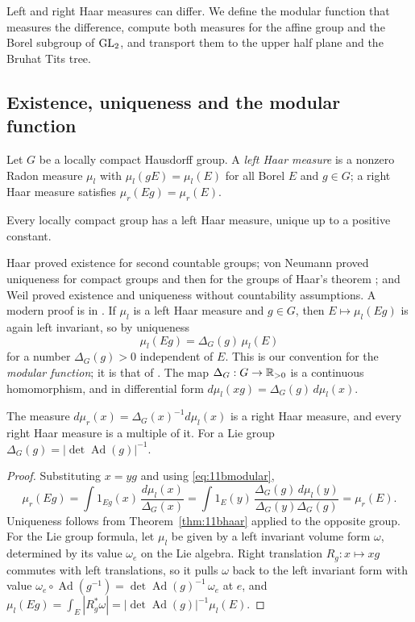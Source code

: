 Left and right Haar measures can differ. We define the modular function that measures the difference, compute both measures for the affine group and the Borel subgroup of $\mathrm{GL}_2$, and transport them to the upper half plane and the Bruhat Tits tree.

\subsection{Existence, uniqueness and the modular function}

Let $G$ be a locally compact Hausdorff group. A \emph{left Haar measure} is a nonzero Radon measure $\mu_l$ with $\mu_l(gE)=\mu_l(E)$ for all Borel $E$ and $g\in G$; a right Haar measure satisfies $\mu_r(Eg)=\mu_r(E)$.

\begin{theorem}\label{thm:11bhaar}
Every locally compact group has a left Haar measure, unique up to a positive constant.
\end{theorem}

Haar \cite{haar1933} proved existence for second countable groups; von Neumann proved uniqueness for compact groups \cite{vonneumann1934} and then for the groups of Haar's theorem \cite{vonneumann1936}; and Weil \cite{weil1940} proved existence and uniqueness without countability assumptions. A modern proof is in \cite{folland1995}. If $\mu_l$ is a left Haar measure and $g\in G$, then $E\mapsto\mu_l(Eg)$ is again left invariant, so by uniqueness
\begin{equation}\label{eq:11bmodular}
\mu_l(Eg)=\Delta_G(g)\,\mu_l(E)
\end{equation}
for a number $\Delta_G(g)>0$ independent of $E$. This is our convention for the \emph{modular function}; it is that of \cite{folland1995}. The map $\Delta_G:G\to\mathbb{R}_{>0}$ is a continuous homomorphism, and in differential form $d\mu_l(xg)=\Delta_G(g)\,d\mu_l(x)$.

\begin{lemma}\label{thm:11bleftright}
The measure $d\mu_r(x)=\Delta_G(x)^{-1}d\mu_l(x)$ is a right Haar measure, and every right Haar measure is a multiple of it. For a Lie group $\Delta_G(g)=|\det\operatorname{Ad}(g)|^{-1}$.
\end{lemma}

\begin{proof}
Substituting $x=yg$ and using \eqref{eq:11bmodular},
\[\mu_r(Eg)=\int 1_{Eg}(x)\,\frac{d\mu_l(x)}{\Delta_G(x)}=\int 1_E(y)\,\frac{\Delta_G(g)\,d\mu_l(y)}{\Delta_G(y)\Delta_G(g)}=\mu_r(E).\]
Uniqueness follows from Theorem~\ref{thm:11bhaar} applied to the opposite group. For the Lie group formula, let $\mu_l$ be given by a left invariant volume form $\omega$, determined by its value $\omega_e$ on the Lie algebra. Right translation $R_g:x\mapsto xg$ commutes with left translations, so it pulls $\omega$ back to the left invariant form with value $\omega_e\circ\operatorname{Ad}(g^{-1})=\det\operatorname{Ad}(g)^{-1}\,\omega_e$ at $e$, and $\mu_l(Eg)=\int_E|R_g^*\omega|=|\det\operatorname{Ad}(g)|^{-1}\mu_l(E)$.
\end{proof}

